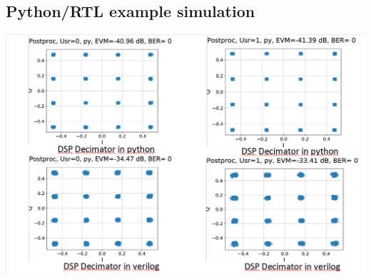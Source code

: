\documentclass{sdkslides}
\begin{document}
\renewcommand{\sectionname}{Python/RTL example simulation}
\subsection*{\sectionname}
\begin{frame}[c]
    \begin{center}
        \includegraphics[width=\textwidth]{Pics/DSP-example-fader2-decimator_effect.png}
    \end{center}
\end{frame}


\renewcommand{\sectionname}{Outphasing transmitter system}
\end{document}
